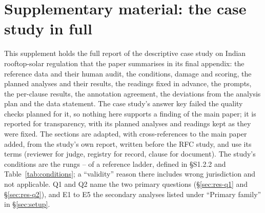 \setcounter{section}{0}\setcounter{subsection}{0}\setcounter{table}{0}\setcounter{figure}{0}
\renewcommand{\thesection}{S\arabic{section}}
\renewcommand{\thetable}{S\arabic{table}}
\renewcommand{\thefigure}{S\arabic{figure}}
\renewcommand{\theHsection}{S\arabic{section}}
\renewcommand{\theHtable}{S\arabic{table}}
\renewcommand{\theHfigure}{S\arabic{figure}}
\section*{Supplementary material: the case study in full}
\noindent This supplement holds the full report of the descriptive case study on Indian rooftop-solar regulation that
the paper summarises in its final appendix: the reference data and their human audit, the conditions, damage and
scoring, the planned analyses and their results, the readings fixed in advance, the prompts, the per-clause results,
the annotation agreement, the deviations from the analysis plan and the data statement. The case study's answer key
failed the quality checks planned for it, so nothing here supports a finding of the main paper; it is reported for
transparency, with its planned analyses and readings kept as they were fixed. The sections are adapted, with cross-references to the main paper added, from the
study's own report, written before the RFC study, and use its terms (reviewer for judge, registry for record, clause
for document). The study's conditions are the rungs -- of a reference ladder, defined in \S S1.2.2 and
Table~\ref{tab:conditions}; a ``validity'' reason there includes wrong jurisdiction and not applicable. Q1 and Q2 name
the two primary questions (\S\ref{sec:res-q1} and \S\ref{sec:res-q2}), and E1 to E5 the secondary analyses listed
under ``Primary family'' in \S\ref{sec:setup}.




